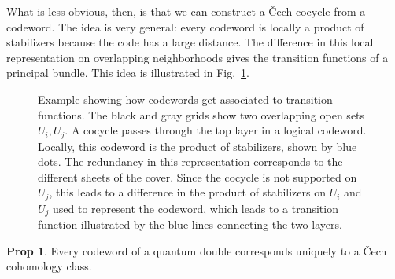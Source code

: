 \documentclass[11pt]{article}
\theoremstyle{definition}
\newtheorem{prop}{Prop}
\begin{document}
What is less obvious, then, is that we can construct a \v{C}ech cocycle from a
codeword. The idea is very general: every codeword is locally a product of
stabilizers because the code has a large distance. The difference in this local
representation on overlapping neighborhoods gives the transition functions of a
principal bundle. This idea is illustrated in Fig.~\ref{fig:transition_function_example}.
\begin{figure}
    \centering
    
    \caption{Example showing how codewords get associated to transition
      functions. The black and gray grids show two overlapping open sets $U_i,
      U_j$. A cocycle passes through the top layer in a logical codeword.
      Locally, this codeword is the product of stabilizers, shown by blue dots.
    The redundancy in this representation corresponds
    to the different sheets of the cover.
      Since the cocycle is not supported on $U_j$, this leads to a difference in
    the product of stabilizers on $U_i$ and $U_j$ used to represent the
    codeword, which leads to a transition function illustrated by the blue lines
  connecting the two layers.}
    \label{fig:transition_function_example}
  \end{figure}


\begin{prop}
  Every codeword of a quantum double corresponds uniquely to a \v{C}ech
  cohomology class.
\end{prop}
\end{document}
